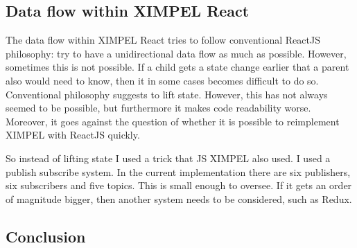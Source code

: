 \subsection{Data flow within XIMPEL React}
The data flow within XIMPEL React tries to follow conventional ReactJS philosophy: try to have a unidirectional data flow as much as possible. However, sometimes this is not possible. If a child gets a state change earlier that a parent also would need to know, then it in some cases becomes difficult to do so. Conventional philosophy suggests to lift state. However, this has not always seemed to be possible, but furthermore it makes code readability worse. Moreover, it goes against the question of whether it is possible to reimplement XIMPEL with ReactJS quickly. 

So instead of lifting state I used a trick that JS XIMPEL also used. I used a publish subscribe system. In the current implementation there are six publishers, six subscribers and five topics. This is small enough to oversee. If it gets an order of magnitude bigger, then another system needs to be considered, such as Redux.

\subsection{Conclusion}

